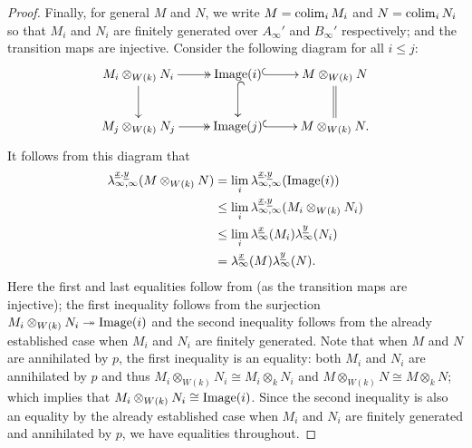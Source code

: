 \documentclass[12pt]{amsart}
\numberwithin{equation}{theorem}
\numberwithin{equation}{theorem}
\begin{document}
\begin{proof}
Finally, for general $M$ and $N$, we write $M=\operatorname{{colim}}_i M_i$ and $N=\operatorname{{colim}}_i N_i$ so that $M_i$ and $N_i$ are finitely generated over $A_\infty'$ and $B_\infty'$ respectively; and the transition maps are injective. Consider the following diagram for all $i\leq j$:
\[\xymatrix{
M_i \otimes_{W(k)} N_i \ar@{->>}[r] \ar[d] & \Image(i) \ar@{^{(}->}[r] \ar@{^{(}->}[d] & M \otimes_{W(k)} N \ar@{=}[d]\\
M_j \otimes_{W(k)} N_j \ar@{->>}[r]  & \Image(j) \ar@{^{(}->}[r]  & M \otimes_{W(k)} N. \\
}\]
It follows from this diagram that 
\begin{align*}
\lambda_{\infty,\infty}^{\underline{x},\underline{y}}(M\otimes_{W(k)}N) & = \lim_i \lambda_{\infty,\infty}^{\underline{x},\underline{y}}(\operatorname{Image}(i)) \\
& \leq  \lim_i \lambda_{\infty,\infty}^{\underline{x},\underline{y}}(M_i\otimes_{W(k)}N_i)  \\
& \leq \lim_i \lambda_\infty^{\underline{x}}(M_i)\lambda_\infty^{\underline{y}}(N_i) \\
& = \lambda_\infty^{\underline{x}}(M)\lambda_\infty^{\underline{y}}(N).
\end{align*}
Here the first and last equalities follow from \cite[Proposition 2.2.6 (b)]{CaiLeeMaSchwedeTuckerPerfdSignature2026} (as the transition maps are injective); the first inequality follows from the surjection $M_i \otimes_{W(k)} N_i \twoheadrightarrow \operatorname{Image}(i)$ and the second inequality follows from the already established case when $M_i$ and $N_i$ are finitely generated. Note that when $M$ and $N$ are annihilated by $p$, the first inequality is an equality: both $M_i$ and $N_i$ are annihilated by $p$ and thus $M_i \otimes_{W(k)} N_i \cong M_i \otimes_{k} N_i$ and $M\otimes_{W(k)} N \cong M \otimes_{k} N$; which implies that $M_i \otimes_{W(k)} N_i \cong \operatorname{Image}(i)$. Since the second inequality is also an equality by the already established case when $M_i$ and $N_i$ are finitely generated and annihilated by $p$, we have equalities throughout. 
\end{proof}
\end{document}
